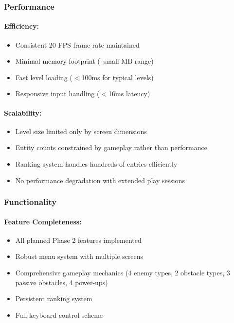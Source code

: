 \documentclass[12pt,a4paper]{article}
\begin{document}
\subsubsection{Performance}

\paragraph{Efficiency:}
\begin{itemize}
    \item Consistent 20 FPS frame rate maintained
    \item Minimal memory footprint (~small MB range)
    \item Fast level loading ($<$100ms for typical levels)
    \item Responsive input handling ($<$16ms latency)
\end{itemize}

\paragraph{Scalability:}
\begin{itemize}
    \item Level size limited only by screen dimensions
    \item Entity counts constrained by gameplay rather than performance
    \item Ranking system handles hundreds of entries efficiently
    \item No performance degradation with extended play sessions
\end{itemize}

\subsubsection{Functionality}

\paragraph{Feature Completeness:}
\begin{itemize}
    \item All planned Phase 2 features implemented
    \item Robust menu system with multiple screens
    \item Comprehensive gameplay mechanics (4 enemy types, 2 obstacle types, 3 passive obstacles, 4 power-ups)
    \item Persistent ranking system
    \item Full keyboard control scheme
\end{itemize}
\end{document}

